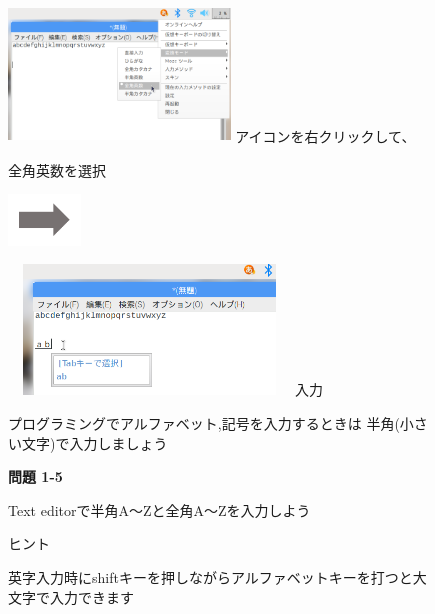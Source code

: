 \documentclass[a4paper,12pt]{jarticle}
\begin{document}
\begin{figure}[ht]
  \begin{minipage}{7.173cm}
    \includegraphics[width=5.889cm,height=3.596cm]{textbook-img069.png}
     アイコンを右クリックして、

    全角英数を選択
  \end{minipage}
  \includegraphics[width=1.919cm,height=1.365cm]{textbook-img053.png}
  \begin{minipage}{7.178cm}
    \includegraphics[width=7.471cm,height=3.469cm]{textbook-img070.png}
     入力
  \end{minipage}

  \vspace{3mm}
  \begin{minipage}{16.578cm}
    {\centering\large
      プログラミングでアルファベット,記号を入力するときは
      半角(小さい文字)で入力しましょう
    }
  \end{minipage}

  \flushleft
  {\bfseries 問題 1-5}

  Text editorで半角A〜Zと全角A〜Zを入力しよう

  ヒント


  英字入力時にshiftキーを押しながらアルファベットキーを打つと大文字で入力できます
\end{figure}
\clearpage
\end{document}
